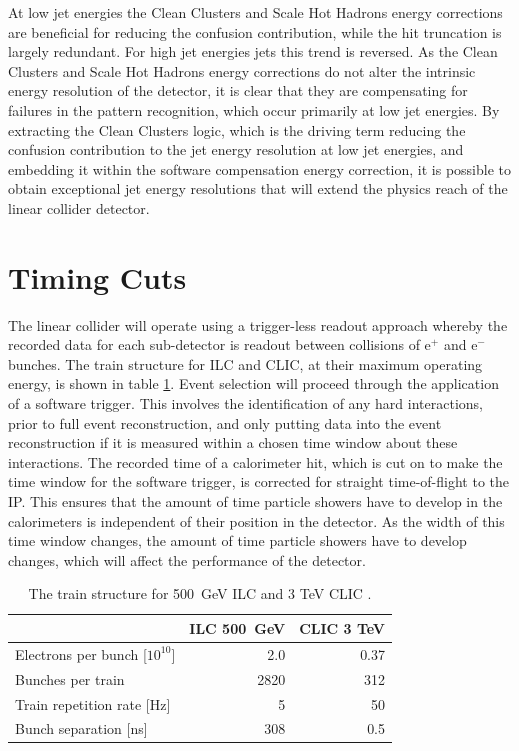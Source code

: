 At low jet energies the Clean Clusters and Scale Hot Hadrons energy corrections are beneficial for reducing the confusion contribution, while the hit truncation is largely redundant.  For high jet energies jets this trend is reversed.  As the Clean Clusters and Scale Hot Hadrons energy corrections do not alter the intrinsic energy resolution of the detector, it is clear that they are compensating for failures in the pattern recognition, which occur primarily at low jet energies.  By extracting the Clean Clusters logic, which is the driving term reducing the confusion contribution to the jet energy resolution at low jet energies, and embedding it within the software compensation energy correction, it is possible to obtain exceptional jet energy resolutions that will extend the physics reach of the linear collider detector.  


\section{Timing Cuts}
The linear collider will operate using a trigger-less readout approach whereby the recorded data for each sub-detector is readout between collisions of $\text{e}^{+}$ and $\text{e}^{-}$ bunches.  The train structure for ILC and CLIC, at their maximum operating energy, is shown in table \ref{table:trainstructure}.  Event selection will proceed through the application of a software trigger.  This involves the identification of any hard interactions, prior to full event reconstruction, and only putting data into the event reconstruction if it is measured within a chosen time window about these interactions.  The recorded time of a calorimeter hit, which is cut on to make the time window for the software trigger, is corrected for straight time-of-flight to the IP.  This ensures that the amount of time particle showers have to develop in the calorimeters is independent of their position in the detector.  As the width of this time window changes, the amount of time particle showers have to develop changes, which will affect the performance of the detector.  

\begin{table}[h!]
\centering
\begin{tabular}{l r r}
\hline
& ILC 500~GeV & CLIC 3 TeV \\
\hline
Electrons per bunch [$10^{10}$] & 2.0 & 0.37 \\
Bunches per train & 2820 & 312 \\
Train repetition rate [Hz] & 5 & 50 \\
Bunch separation [ns] & 308 & 0.5 \\
\end{tabular}
\caption[The train structure for 500~GeV ILC and 3 TeV CLIC \cite{Behnke:2013lya,Linssen:2012hp}.]{The train structure for 500~GeV ILC and 3 TeV CLIC \cite{Behnke:2013lya,Linssen:2012hp}.}
\label{table:trainstructure}
\end{table}

